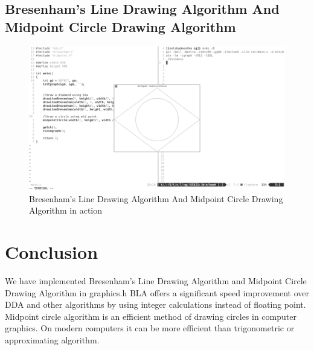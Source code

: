 \documentclass[12pt]{article}
\begin{document}
	\subsection{Bresenham's Line Drawing Algorithm And Midpoint Circle Drawing Algorithm}
	\begin{figure}[h!]
		\hspace*{-1cm}
		\centering
		\includegraphics[width=1.01\linewidth]{output2.png}
		\caption{Bresenham's Line Drawing Algorithm And Midpoint Circle Drawing Algorithm in action}
		\label{fig:bresenham and circle}
	\end{figure}

	\section{Conclusion}
	We have implemented Bresenham's Line Drawing Algorithm and Midpoint Circle Drawing Algorithm in graphics.h
	BLA offers a significant speed improvement over DDA and other algorithms by using integer calculations instead of floating point.
	Midpoint circle algorithm is an efficient method of drawing circles in computer graphics. On modern computers it can be more efficient than trigonometric or approximating algorithm.
\end{document}
